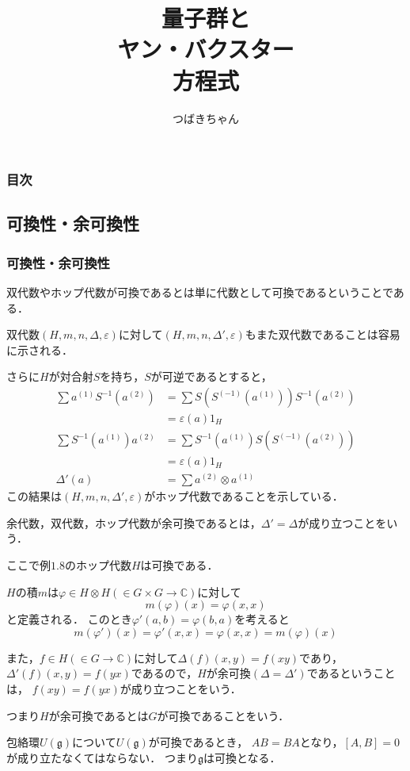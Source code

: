 \documentclass[10pt,dvipdfm]{beamer}
\title{量子群と\\ヤン・バクスター\\方程式}
\author{つばきちゃん}
\newcommand{\CC}{\mathbb{C}}
\begin{document}
  \begin{frame}
    \titlepage
  \end{frame}
  \begin{frame}
    \frametitle{目次}
    \tableofcontents
  \end{frame}
  \subsection{可換性・余可換性}
  \begin{frame}
    \frametitle{可換性・余可換性}
    双代数やホップ代数が可換であるとは単に代数として可換であるということである．

    双代数$(H,m,n,\Delta,\varepsilon)$に対して$(H,m,n,\Delta',\varepsilon)$もまた双代数であることは容易に示される．

    さらに$H$が対合射$S$を持ち，$S$が可逆であるとすると，
    \begin{align*}
      \sum a^{(1)}S^{-1}(a^{(2)}) &= \sum S(S^{(-1)}(a^{(1)}))S^{-1}(a^{(2)}) \\
      &= \varepsilon(a)1_H\\
      \sum S^{-1}(a^{(1)})a^{(2)} &= \sum S^{-1}(a^{(1)})S(S^{(-1)}(a^{(2)})) \\
      &= \varepsilon(a)1_H\\
      \Delta'(a) &= \sum a^{(2)}\otimes a^{(1)}
    \end{align*}
    この結果は$(H,m,n,\Delta',\varepsilon)$がホップ代数であることを示している．
  \end{frame}
  \begin{frame}
    \begin{definition}
      余代数，双代数，ホップ代数が余可換であるとは，$\Delta' = \Delta$が成り立つことをいう．
    \end{definition}
    ここで例$1.8$のホップ代数$H$は可換である．
    
    $H$の積$m$は$\varphi\in H\otimes H(\in G\times G \to \CC)$に対して
    \[
    m(\varphi)(x) = \varphi(x,x)
    \]
    と定義される．
    このとき$\varphi'(a,b)=\varphi(b,a)$を考えると
    \[
    m(\varphi')(x) = \varphi'(x,x) = \varphi(x,x) = m(\varphi)(x)
    \]
  \end{frame}
  \begin{frame}
    また，$f \in H (\in G \to \CC)$に対して$\Delta(f)(x,y) = f(xy)$であり，
    $\Delta'(f)(x,y) = f(yx)$であるので，$H$が余可換$(\Delta=\Delta')$であるということは，
    $f(xy) = f(yx)$が成り立つことをいう．

    つまり$H$が余可換であるとは$G$が可換であることをいう．

    包絡環$U(\mathfrak{g})$について$U(\mathfrak{g})$が可換であるとき，
    $AB=BA$となり，$[A,B]=0$が成り立たなくてはならない．
    つまり$\mathfrak{g}$は可換となる．
  \end{frame}
\end{document}
